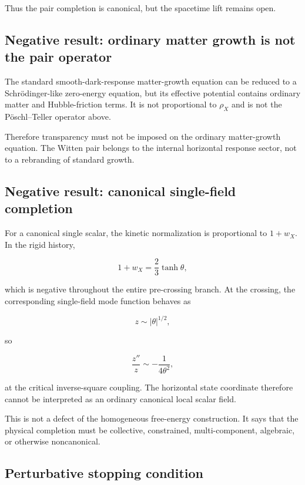 \documentclass[
  11pt,
  letterpaper,
]{article}
\begin{document}
Thus the pair completion is canonical, but the spacetime lift remains
open.

\subsection{Negative result: ordinary matter growth is not the pair
operator}\label{negative-result-ordinary-matter-growth-is-not-the-pair-operator}

The standard smooth-dark-response matter-growth equation can be reduced
to a Schrödinger-like zero-energy equation, but its effective potential
contains ordinary matter and Hubble-friction terms. It is not
proportional to \(\rho_X\) and is not the Pöschl--Teller operator above.

Therefore transparency must not be imposed on the ordinary matter-growth
equation. The Witten pair belongs to the internal horizontal response
sector, not to a rebranding of standard growth.

\subsection{Negative result: canonical single-field
completion}\label{negative-result-canonical-single-field-completion}

For a canonical single scalar, the kinetic normalization is proportional
to \(1+w_X\). In the rigid history,

\[
1+w_X=\frac23\tanh\theta,
\]

which is negative throughout the entire pre-crossing branch. At the
crossing, the corresponding single-field mode function behaves as

\[
z\sim|\theta|^{1/2},
\]

so

\[
\frac{z''}{z}\sim-\frac1{4\theta^2},
\]

at the critical inverse-square coupling. The horizontal state coordinate
therefore cannot be interpreted as an ordinary canonical local scalar
field.

This is not a defect of the homogeneous free-energy construction. It
says that the physical completion must be collective, constrained,
multi-component, algebraic, or otherwise noncanonical.

\subsection{Perturbative stopping
condition}\label{perturbative-stopping-condition}
\end{document}
